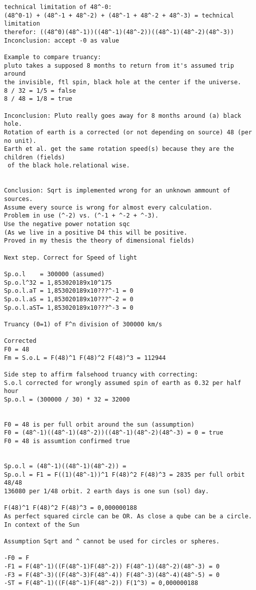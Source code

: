 \documentclass{article}
\begin{document}
\begin{verbatim}
technical limitation of 48^-0: 
(48^0-1) + (48^-1 + 48^-2) + (48^-1 + 48^-2 + 48^-3) = technical limitation
therefor: ((48^0)(48^-1))((48^-1)(48^-2))((48^-1)(48^-2)(48^-3))
Inconclusion: accept -0 as value

Example to compare truancy:
pluto takes a supposed 8 months to return from it's assumed trip around 
the invisible, ftl spin, black hole at the center if the universe.
8 / 32 = 1/5 = false
8 / 48 = 1/8 = true

Inconclusion: Pluto really goes away for 8 months around (a) black hole.
Rotation of earth is a corrected (or not depending on source) 48 (per no unit).
Earth et al. get the same rotation speed(s) because they are the children (fields)
 of the black hole.relational wise.


Conclusion: Sqrt is implemented wrong for an unknown ammount of sources. 
Assume every source is wrong for almost every calculation.
Problem in use (^-2) vs. (^-1 + ^-2 + ^-3). 
Use the negative power notation sqc 
(As we live in a positive D4 this will be positive. 
Proved in my thesis the theory of dimensional fields)

Next step. Correct for Speed of light
 
Sp.o.l    = 300000 (assumed)
Sp.o.l^32 = 1,853020189x10^175
Sp.o.l.aT = 1,853020189x10???^-1 = 0
Sp.o.l.aS = 1,853020189x10???^-2 = 0
Sp.o.l.aST= 1,853020189x10???^-3 = 0

Truancy (0=1) of F^n division of 300000 km/s

Corrected
F0 = 48
Fm = S.o.L = F(48)^1 F(48)^2 F(48)^3 = 112944

Side step to affirm falsehood truancy with correcting:
S.o.l corrected for wrongly assumed spin of earth as 0.32 per half hour
Sp.o.l = (300000 / 30) * 32 = 32000


F0 = 48 is per full orbit around the sun (assumption)
F0 = (48^-1)((48^-1)(48^-2))((48^-1)(48^-2)(48^-3) = 0 = true
F0 = 48 is assumtion confirmed true


Sp.o.l = (48^-1)((48^-1)(48^-2)) = 
Sp.o.l = F1 = F((1)(48^-1))^1 F(48)^2 F(48)^3 = 2835 per full orbit 48/48
136080 per 1/48 orbit. 2 earth days is one sun (sol) day.

F(48)^1 F(48)^2 F(48)^3 = 0,000000188 
As perfect squared circle can be OR. As close a qube can be a circle. 
In context of the Sun

Assumption Sqrt and ^ cannot be used for circles or spheres.

-F0 = F
-F1 = F(48^-1)((F(48^-1)F(48^-2)) F(48^-1)(48^-2)(48^-3) = 0
-F3 = F(48^-3)((F(48^-3)F(48^-4)) F(48^-3)(48^-4)(48^-5) = 0
-ST = F(48^-1)((F(48^-1)F(48^-2)) F(1^3) = 0,000000188


\end{verbatim}
\end{document}
